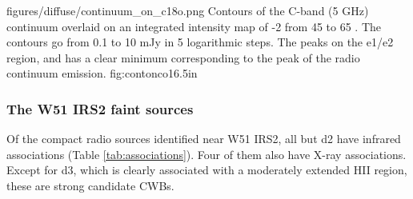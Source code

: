 \Figure
{figures/diffuse/continuum_on_c18o.png}
{Contours of the C-band (5 GHz) continuum overlaid on an integrated intensity
map of -2 from 45 to 65 \kms \citep{Parsons2012a}.  The contours
go from 0.1 to 10 mJy in 5 logarithmic steps.  The \ceighteeno peaks on the
e1/e2 region, and has a clear minimum corresponding to the peak of the radio
continuum emission.
}
{fig:contonco}{1}{6.5in}

\subsubsection{The W51 IRS2 faint sources}

Of the compact radio sources identified near W51 IRS2, all but d2 have infrared
associations (Table \ref{tab:associations}).  Four of them also have X-ray
associations.  Except for d3, which is clearly associated with a moderately
extended HII region, these are strong candidate CWBs.



%
%
%




